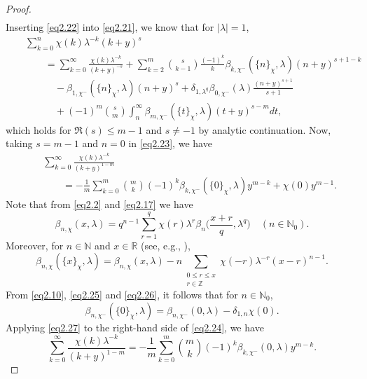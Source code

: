\documentclass[10pt,a4paper]{amsart}
\begin{document}
\begin{proof}
\begin{eqnarray}
\end{eqnarray}
Inserting \eqref{eq2.22} into \eqref{eq2.21}, we know that for $|\lambda|=1$,
\begin{eqnarray}\label{eq2.23}
&&\sum_{k=0}^{n}\chi(k)\lambda^{-k}(k+y)^{s}\nonumber\\
&&\qquad=\sum_{k=0}^{\infty}\frac{\chi(k)\lambda^{-k}}{(k+y)^{-s}}+\sum_{k=2}^{m}\binom{s}{k-1}\frac{(-1)^{k}}{k}\beta_{k,\chi^{-}}(\{n\}_{\chi},\lambda)(n+y)^{s+1-k}\nonumber\\
&&\qquad\quad-\beta_{1,\chi^{-}}(\{n\}_{\chi},\lambda)(n+y)^{s}+\delta_{1,\lambda^{q}}\beta_{0,\chi^{-}}(\lambda)\frac{(n+y)^{s+1}}{s+1}\nonumber\\
&&\qquad\quad+(-1)^{m}\binom{s}{m}\int_{n}^{\infty}\beta_{m,\chi^{-}}(\{t\}_{\chi},\lambda)(t+y)^{s-m}dt,
\end{eqnarray}
which holds for $\Re(s)\leqslant m-1$ and $s\neq-1$ by analytic continuation. Now, taking $s=m-1$ and $n=0$ in \eqref{eq2.23}, we have
\begin{eqnarray}\label{eq2.24}
&&\sum_{k=0}^{\infty}\frac{\chi(k)\lambda^{-k}}{(k+y)^{1-m}}\nonumber\\
&&\qquad=-\frac{1}{m}\sum_{k=0}^{m}\binom{m}{k}(-1)^{k}\beta_{k,\chi^{-}}(\{0\}_{\chi},\lambda)y^{m-k}+\chi(0)y^{m-1}.
\end{eqnarray}
Note that from \eqref{eq2.2} and \eqref{eq2.17} we have
\begin{equation}\label{eq2.25}
\beta_{n,\chi}(x,\lambda)=q^{n-1}\sum_{r=1}^{q}\chi(r)\lambda^{r}\beta_{n}\biggl(\frac{x+r}{q},\lambda^{q}\biggl)\quad(n\in\mathbb{N}_{0}).
\end{equation}
Moreover, for $n\in\mathbb{N}$ and $x\in\mathbb{R}$ (see, e.g., \cite[Propostion 2.8]{he}),
\begin{equation}\label{eq2.26}
\beta_{n,\chi}(\{x\}_{\chi},\lambda)=\beta_{n,\chi}(x,\lambda)-n\underset{\substack{0\leqslant r\leqslant x\\ r\in\mathbb{Z}}}{\sum}\chi(-r)\lambda^{-r}(x-r)^{n-1}.
\end{equation}
From \eqref{eq2.10}, \eqref{eq2.25} and \eqref{eq2.26}, it follows that for $n\in\mathbb{N}_{0}$,
\begin{equation}\label{eq2.27}
\beta_{n,\chi^{-}}(\{0\}_{\chi},\lambda)=\beta_{n,\chi^{-}}(0,\lambda)-\delta_{1,n}\chi(0).
\end{equation}
Applying \eqref{eq2.27} to the right-hand side of \eqref{eq2.24}, we have
\begin{equation}\label{eq2.28}
\sum_{k=0}^{\infty}\frac{\chi(k)\lambda^{-k}}{(k+y)^{1-m}}=-\frac{1}{m}\sum_{k=0}^{m}\binom{m}{k}(-1)^{k}\beta_{k,\chi^{-}}(0,\lambda)y^{m-k}.

\end{equation}
\end{proof}
\end{document}
